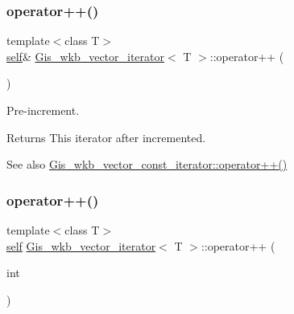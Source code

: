 \subsubsection{\texorpdfstring{operator++()}{operator++()}\hspace{0.1cm}{\footnotesize\ttfamily [1/2]}}
{\footnotesize\ttfamily template$<$class T$>$ \\
\mbox{\hyperlink{classGis__wkb__vector__const__iterator}{self}}\& \mbox{\hyperlink{classGis__wkb__vector__iterator}{Gis\+\_\+wkb\+\_\+vector\+\_\+iterator}}$<$ T $>$\+::operator++ (\begin{DoxyParamCaption}{ }\end{DoxyParamCaption})\hspace{0.3cm}{\ttfamily [inline]}}



Pre-\/increment. 

\begin{DoxyReturn}{Returns}
This iterator after incremented. 
\end{DoxyReturn}
\begin{DoxySeeAlso}{See also}
\mbox{\hyperlink{classGis__wkb__vector__const__iterator_a9cf0ed3395c51ed8c7280d0184b7ce66}{Gis\+\_\+wkb\+\_\+vector\+\_\+const\+\_\+iterator\+::operator++()}} 
\end{DoxySeeAlso}
\mbox{\label{classGis__wkb__vector__iterator_a8df0e51b19a7d8678d70f70f325abb75}} 
\subsubsection{\texorpdfstring{operator++()}{operator++()}\hspace{0.1cm}{\footnotesize\ttfamily [2/2]}}
{\footnotesize\ttfamily template$<$class T$>$ \\
\mbox{\hyperlink{classGis__wkb__vector__const__iterator}{self}} \mbox{\hyperlink{classGis__wkb__vector__iterator}{Gis\+\_\+wkb\+\_\+vector\+\_\+iterator}}$<$ T $>$\+::operator++ (\begin{DoxyParamCaption}\item[{int}]{ }\end{DoxyParamCaption})\hspace{0.3cm}{\ttfamily [inline]}}



